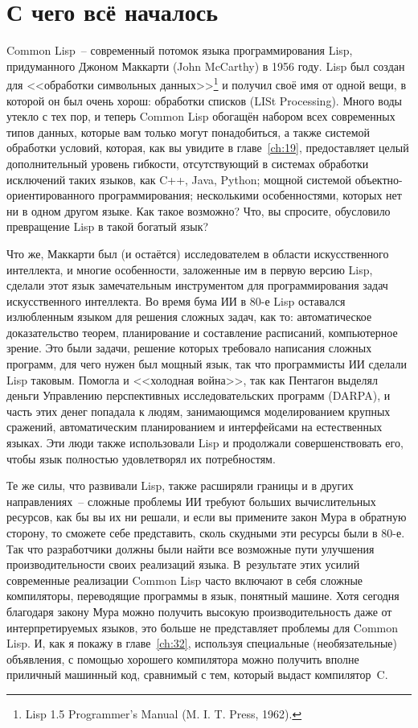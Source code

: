 \section{С чего всё началось}

Common Lisp~-- современный потомок языка программирования Lisp, придуманного Джоном
Маккарти (John McCarthy) в 1956 году. Lisp был создан для <<обработки символьных
данных>>\footnote{Lisp 1.5 Programmer's Manual (M. I. T. Press, 1962).} и получил своё имя от
одной вещи, в которой он был очень хорош: обработки списков (LISt Processing). Много воды
утекло с тех пор, и теперь Common Lisp обогащён набором всех современных типов данных, которые
вам только могут понадобиться, а также системой обработки условий, которая, как вы
увидите в главе~\ref{ch:19}, предоставляет целый дополнительный уровень гибкости, отсутствующий в системах обработки
исключений таких языков, как C++, Java, Python; мощной системой объектно-ориентированного
программирования; несколькими особенностями, которых нет ни в одном другом языке. Как
такое возможно? Что, вы спросите, обусловило превращение Lisp в такой богатый язык?

Что же, Маккарти был (и остаётся)
исследователем в области искусственного интеллекта, и многие
особенности, заложенные им в первую версию Lisp, сделали этот язык замечательным
инструментом для программирования задач искусственного интеллекта. Во время бума ИИ в 80-е Lisp
оставался излюбленным языком для решения сложных задач, как то: автоматическое
доказательство теорем, планирование и составление расписаний, компьютерное зрение. Это
были задачи, решение которых требовало написания сложных программ, для чего нужен был мощный язык,
так что программисты ИИ сделали Lisp таковым. Помогла и <<холодная война>>, так как Пентагон
выделял деньги Управлению перспективных исследовательских программ (DARPA), и часть этих
денег попадала к людям, занимающимся моделированием крупных сражений, автоматическим
планированием и интерфейсами на естественных языках. Эти люди также использовали Lisp и
продолжали совершенствовать его, чтобы язык полностью удовлетворял их потребностям.

Те же силы, что развивали Lisp, также расширяли границы и в других направлениях~--
сложные проблемы ИИ требуют больших вычислительных ресурсов, как бы вы их ни решали, и
если вы примените закон Мура в обратную сторону, то сможете себе представить, сколь
скудными эти ресурсы были в 80-е. Так что разработчики должны были найти все возможные
пути улучшения производительности своих реализаций языка. В~результате этих усилий
современные реализации Common Lisp часто включают в себя сложные компиляторы, переводящие
программы в язык,
понятный машине. Хотя сегодня благодаря закону Мура можно получить высокую
производительность даже от интерпретируемых языков, это больше не представляет проблемы для
Common Lisp. И, как я покажу в главе~\ref{ch:32}, используя специальные (необязательные)
объявления, с помощью хорошего компилятора можно получить вполне приличный машинный код,
сравнимый с тем, который выдаст компилятор~C.

